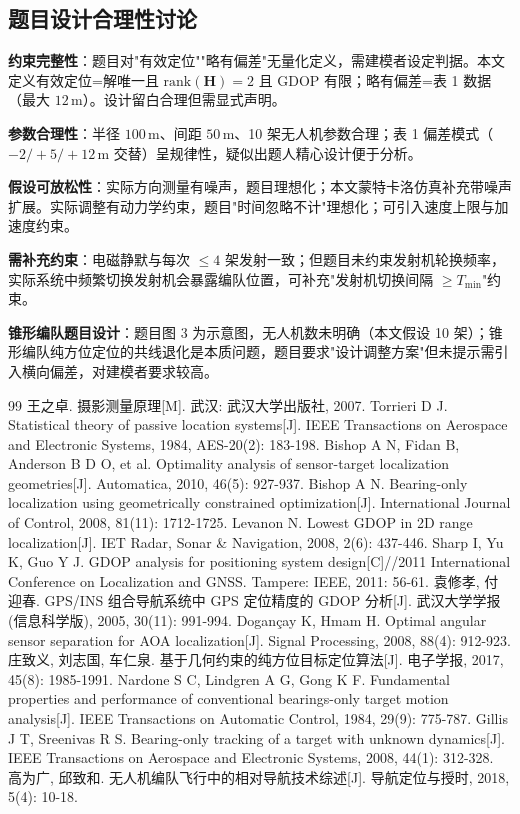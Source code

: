 \documentclass[12pt,a4paper]{ctexart}
\newcommand{\unit}[1]{\ensuremath{\,\mathrm{#1}}}
\begin{document}
\subsection{题目设计合理性讨论}

\textbf{约束完整性}：题目对"有效定位""略有偏差"无量化定义，需建模者设定判据。本文定义有效定位=解唯一且 $\text{rank}(\mathbf{H})=2$ 且 GDOP 有限；略有偏差=表 1 数据（最大 $12\unit{m}$）。设计留白合理但需显式声明。

\textbf{参数合理性}：半径 $100\unit{m}$、间距 $50\unit{m}$、10 架无人机参数合理；表 1 偏差模式（$-2/+5/+12\unit{m}$ 交替）呈规律性，疑似出题人精心设计便于分析。

\textbf{假设可放松性}：实际方向测量有噪声，题目理想化；本文蒙特卡洛仿真补充带噪声扩展。实际调整有动力学约束，题目"时间忽略不计"理想化；可引入速度上限与加速度约束。

\textbf{需补充约束}：电磁静默与每次 $\leq 4$ 架发射一致；但题目未约束发射机轮换频率，实际系统中频繁切换发射机会暴露编队位置，可补充"发射机切换间隔 $\geq T_{\min}$"约束。

\textbf{锥形编队题目设计}：题目图 3 为示意图，无人机数未明确（本文假设 10 架）；锥形编队纯方位定位的共线退化是本质问题，题目要求"设计调整方案"但未提示需引入横向偏差，对建模者要求较高。

\begin{thebibliography}{99}
 王之卓. 摄影测量原理[M]. 武汉: 武汉大学出版社, 2007.
 Torrieri D J. Statistical theory of passive location systems[J]. IEEE Transactions on Aerospace and Electronic Systems, 1984, AES-20(2): 183-198.
 Bishop A N, Fidan B, Anderson B D O, et al. Optimality analysis of sensor-target localization geometries[J]. Automatica, 2010, 46(5): 927-937.
 Bishop A N. Bearing-only localization using geometrically constrained optimization[J]. International Journal of Control, 2008, 81(11): 1712-1725.
 Levanon N. Lowest GDOP in 2D range localization[J]. IET Radar, Sonar \& Navigation, 2008, 2(6): 437-446.
 Sharp I, Yu K, Guo Y J. GDOP analysis for positioning system design[C]//2011 International Conference on Localization and GNSS. Tampere: IEEE, 2011: 56-61.
 袁修孝, 付迎春. GPS/INS 组合导航系统中 GPS 定位精度的 GDOP 分析[J]. 武汉大学学报(信息科学版), 2005, 30(11): 991-994.
 Dogançay K, Hmam H. Optimal angular sensor separation for AOA localization[J]. Signal Processing, 2008, 88(4): 912-923.
 庄致义, 刘志国, 车仁泉. 基于几何约束的纯方位目标定位算法[J]. 电子学报, 2017, 45(8): 1985-1991.
 Nardone S C, Lindgren A G, Gong K F. Fundamental properties and performance of conventional bearings-only target motion analysis[J]. IEEE Transactions on Automatic Control, 1984, 29(9): 775-787.
 Gillis J T, Sreenivas R S. Bearing-only tracking of a target with unknown dynamics[J]. IEEE Transactions on Aerospace and Electronic Systems, 2008, 44(1): 312-328.
 高为广, 邱致和. 无人机编队飞行中的相对导航技术综述[J]. 导航定位与授时, 2018, 5(4): 10-18.
\end{thebibliography}
\end{document}
